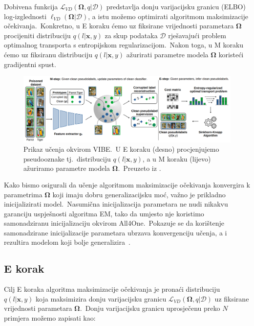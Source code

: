 \documentclass[diplomskirad]{fer}
\begin{document}
Dobivena funkcija $\mathcal{L}_{VD}(\bm{\Omega}, q | \mathcal{D})$ predstavlja donju varijacijsku granicu (ELBO) log-izglednosti $\ell_{VD}(\bm{\Omega}|\mathcal{D})$, a istu možemo optimirati algoritmom maksimizacije očekivanja.\ 
Konkretno, u E koraku ćemo uz fiksirane vrijednosti parametara $\bm{\Omega}$ procijeniti distribuciju $q(l | \bm{x}, y)$ za skup podataka $\mathcal{D}$ rješavajući problem optimalnog transporta s entropijskom regularizacijom.\ 
Nakon toga, u M koraku ćemo uz fiksiranu distribuciju $q(l | \bm{x}, y)$ ažurirati parametre modela $\bm{\Omega}$ koristeći gradijentni spust.\ 

\begin{figure}[h]
  \centering
  \includegraphics[scale=0.6]{./Slike/vibe.png}
  \caption{Prikaz učenja okvirom VIBE.\ U E koraku (desno) procjenjujemo pseudooznake tj.\ distribuciju $q(l | \bm{x}, y)$, a u M koraku (lijevo) ažuriramo parametre modela $\bm{\Omega}$.\ Preuzeto iz \cite{sabolic2025seal}.}
  \label{fig:vibe}
\end{figure}

Kako bismo osigurali da učenje algoritmom maksimizacije očekivanja konvergira k parametrima $\bm{\Omega}$ koji imaju dobru generalizacijsku moć, važno je prikladno inicijalizirati model.\ 
Nasumična inicijalizacija parametara ne nudi nikakvu garanciju uspješnosti algoritma EM, tako da umjesto nje koristimo samonadziranu inicijalizaciju okvirom All4One.\ 
Pokazuje se da korištenje samonadzirane inicijalizacije parametara ubrzava konvergenciju učenja, a i rezultira modelom koji bolje generalizira~\cite{sabolic2025seal}.\

\subsection{E korak}
\label{sub:e_korak}

Cilj E koraka algoritma maksimizacije očekivanja je pronaći distribuciju $q(l | \bm{x}, y)$ koja maksimizira donju varijacijsku granicu $\mathcal{L}_{VD}(\bm{\Omega}, q | \mathcal{D})$ uz fiksirane vrijednosti parametara $\bm{\Omega}$.\ 
Donju varijacijsku granicu uprosječenu preko $N$ primjera možemo zapisati kao:
\end{document}
